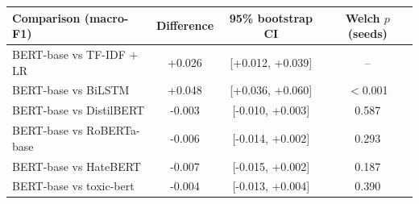 \begin{tabular}{lccc}
\toprule
Comparison (macro-F1) & Difference & 95\% bootstrap CI & Welch $p$ (seeds) \\
\midrule
BERT-base vs TF-IDF + LR & +0.026 & [+0.012, +0.039] & -- \\
BERT-base vs BiLSTM & +0.048 & [+0.036, +0.060] & $<$0.001 \\
BERT-base vs DistilBERT & -0.003 & [-0.010, +0.003] & 0.587 \\
BERT-base vs RoBERTa-base & -0.006 & [-0.014, +0.002] & 0.293 \\
BERT-base vs HateBERT & -0.007 & [-0.015, +0.002] & 0.187 \\
BERT-base vs toxic-bert & -0.004 & [-0.013, +0.004] & 0.390 \\
\bottomrule
\end{tabular}
